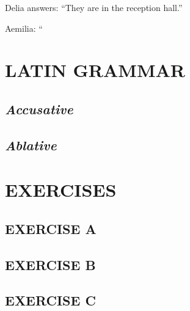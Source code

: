 Delia answers: ``They are in the reception hall.''

Aemilia: ``

\section[Grammar]{LATIN GRAMMAR}
\subsection{\emph{Accusative}}

\subsection{\emph{Ablative}}

\nolinenumbers

\section[Exercises]{EXERCISES}
\subsection*{EXERCISE A}

\subsection*{EXERCISE B}

\subsection*{EXERCISE C}
